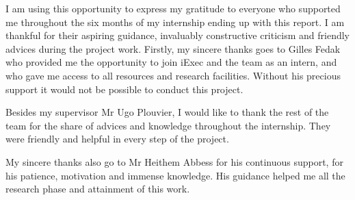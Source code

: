 
\begin{acknowledgements}      

    I am using this opportunity to express my gratitude to everyone who supported me throughout the six months 
    of my internship ending up with this report. I am thankful for their aspiring guidance, invaluably
    constructive criticism and friendly advices during the project work.
    Firstly, my sincere thanks  goes to Gilles Fedak who provided me the opportunity to join iExec
    and the team as an intern, and who gave me access to all resources and research facilities. Without his
    precious support it would not be possible to conduct this project.

    Besides my supervisor Mr Ugo Plouvier, I would like to thank the rest of the team for the share of advices
    and knowledge throughout the internship. They were friendly and helpful in every step of the project.

    My sincere thanks also go to Mr Heithem Abbess for his continuous support, for his patience, motivation 
    and immense knowledge. His guidance helped me all the research phase and attainment of this work.


\end{acknowledgements}
